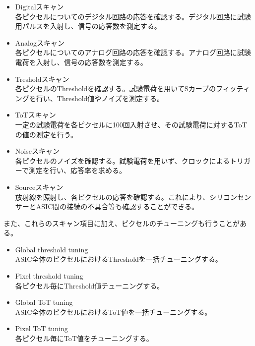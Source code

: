 \begin{itemize}
  \item Digitalスキャン \\
  各ピクセルについてのデジタル回路の応答を確認する。デジタル回路に試験用パルスを入射し、信号の応答数を測定する。
  \item Analogスキャン \\
  各ピクセルについてのアナログ回路の応答を確認する。アナログ回路に試験電荷を入射し、信号の応答数を測定する。
  \item Tresholdスキャン \\
  各ピクセルのThresholdを確認する。試験電荷を用いてSカーブのフィッティングを行い、Threshold値やノイズを測定する。
  \item ToTスキャン \\
  一定の試験電荷を各ピクセルに100回入射させ、その試験電荷に対するToTの値の測定を行う。
  \item Noiseスキャン \\
  各ピクセルのノイズを確認する。試験電荷を用いず、クロックによるトリガーで測定を行い、応答率を求める。
  \item Sourceスキャン \\
  放射線を照射し、各ピクセルの応答を確認する。これにより、シリコンセンサーとASIC間の接続の不具合等も確認することができる。
\end{itemize}

また、これらのスキャン項目に加え、ピクセルのチューニングも行うことがある。
\begin{itemize}
  \item Global threshold tuning \\
  ASIC全体のピクセルにおけるThresholdを一括チューニングする。
  \item Pixel threshold tuning \\
  各ピクセル毎にThreshold値チューニングする。
  \item Global ToT tuning \\
  ASIC全体のピクセルにおけるToT値を一括チューニングする。
  \item Pixel ToT tuning \\
  各ピクセル毎にToT値をチューニングする。
\end{itemize}


